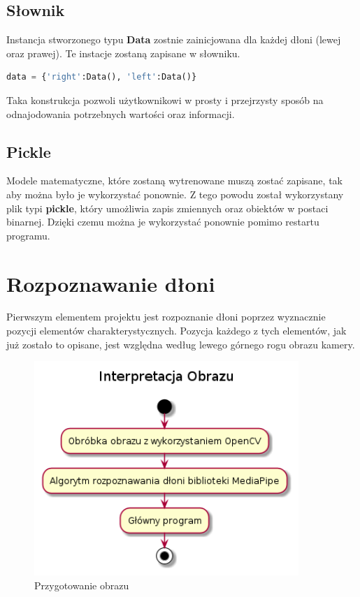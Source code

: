 \subsection{Słownik}

\quad Instancja stworzonego typu \textbf{Data} zostnie zainicjowana dla każdej dłoni (lewej oraz prawej). Te instacje zostaną zapisane w słowniku. 

\begin{lstlisting}[language=python]
    data = {'right':Data(), 'left':Data()}
\end{lstlisting}

\quad Taka konstrukcja pozwoli użytkownikowi w prosty i przejrzysty sposób na odnajodowania potrzebnych wartości oraz informacji. 

\subsection{Pickle}
\quad Modele matematyczne, które zostaną wytrenowane muszą zostać zapisane, tak aby można było je wykorzystać ponownie. Z tego powodu został wykorzystany plik typi \textbf{pickle}, który umożliwia zapis zmiennych oraz obiektów w postaci binarnej. Dzięki czemu można je wykorzystać ponownie pomimo restartu programu. 

\section{Rozpoznawanie dłoni}

\quad Pierwszym elementem projektu jest rozpoznanie dłoni poprzez wyznacznie pozycji elementów charakterystycznych. Pozycja każdego z tych elementów, jak już zostało to opisane, jest względna według lewego górnego rogu obrazu kamery. 

\begin{figure}[H]
    \begin{center}
        \includegraphics[width=10cm]{../images/image_processing.png}
        \caption{Przygotowanie obrazu}
    \end{center}
\end{figure}

